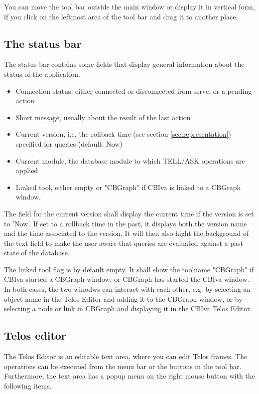 You can move the tool bar outside the
main window or display it in vertical form, if you click on the leftmost area of the tool bar
and drag it to another place.




\subsection{The status bar}

The status bar contains some fields that display general information about the status of the application.

\begin{itemize}
\item Connection status, either connected or disconnected from serve, or a pending action
\item Short message, usually about the result of the last action
\item Current version, i.e. the rollback time (see section \ref{sec:representation})
     specified for queries (default: Now)
\item Current module, the database module to which TELL/ASK operations are applied
\item Linked tool, either empty or "CBGraph" if CBIva is linked to a CBGraph window.
\end{itemize}

The field for the current version shall display the current time if the
version is set to 'Now'. If set to a rollback time in the past, it displays
both the version name and the time associated to the version. It will
then also hight the background of the text field to make the user aware
that queries are evaluated against a past state of the database.

The linked tool flag is by default empty. It shall show the toolname "CBGraph" if CBIva
started a CBGraph window, or CBGraph has started the CBIva window. In both cases, the two winodws
can interact with each other, e.g. by selecting an object name in the Telos Editor
and adding it to the CBGraph window, or by selecting a node or link in CBGraph and displaying it
in the CBIva Telos Editor.



\subsection{Telos editor}
\label{sec:telos_ed}

The Telos Editor is an editable text area, where you can edit Telos frames.
The operations can be executed from the menu bar or the buttons in the tool bar.
Furthermore, the text area has a popup menu on the right mouse button with
the following items.

